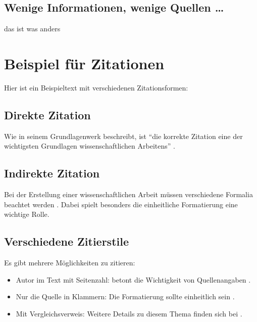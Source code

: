 \section{Wenige Informationen, wenige Quellen \dots}
\label{sec:Quellenlage}
das ist was anders

\chapter{Beispiel für Zitationen}

Hier ist ein Beispieltext mit verschiedenen Zitationsformen:

\section{Direkte Zitation}
Wie  in seinem Grundlagenwerk beschreibt, ist ``die korrekte Zitation eine der wichtigsten Grundlagen wissenschaftlichen Arbeitens'' .

\section{Indirekte Zitation}
Bei der Erstellung einer wissenschaftlichen Arbeit müssen verschiedene Formalia beachtet werden . Dabei spielt besonders die einheitliche Formatierung eine wichtige Rolle.

\section{Verschiedene Zitierstile}
Es gibt mehrere Möglichkeiten zu zitieren:
\begin{itemize}
    \item Autor im Text mit Seitenzahl:  betont die Wichtigkeit von Quellenangaben .
    \item Nur die Quelle in Klammern: Die Formatierung sollte einheitlich sein .
    \item Mit Vergleichsverweis: Weitere Details zu diesem Thema finden sich bei .
\end{itemize}

% 
% 